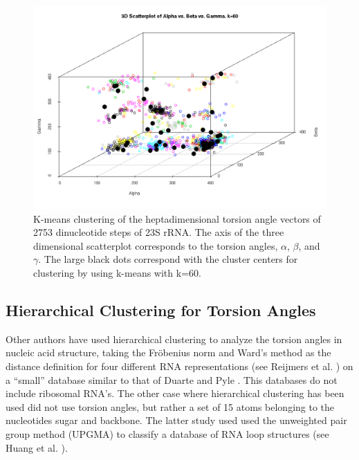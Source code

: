 \begin{figure}[htbp]
 \centering
 \includegraphics[angle=90, scale=0.50]{hartigan_k60_3D_b.png}
 \caption{K-means  clustering  of  the heptadimensional  torsion  angle
vectors of 2753 dinucleotide steps of  23S rRNA. The axis of the three
dimensional scatterplot  corresponds to the  torsion angles, $\alpha$,
$\beta$,  and $\gamma$.   The  large black  dots  correspond with  the
cluster centers for clustering by using k-means with k=60.}
 \label{fig:3d}
\end{figure}


\subsection{Hierarchical Clustering for Torsion Angles}
Other  authors have  used hierarchical clustering  to analyze the
torsion angles in nucleic acid structure, taking the Fr\"{o}benius
norm and Ward's method as the distance definition
for   four   different    RNA   representations   (see   Reijmers   et
al.  \cite{reijmers2001}) on  a ``small''  database similar to that of
Duarte and Pyle  \cite{duarte1998}. This  databases  do not
include ribosomal RNA's. The other  case where hierarchical clustering
has been used  did not  use torsion  angles, but rather a set  of  15 atoms
belonging  to the  nucleotides sugar  and  backbone. The latter study
used used  the unweighted pair  group method  (UPGMA) to classify  a database  of RNA
loop structures (see Huang et al. \cite{huang2005}).

